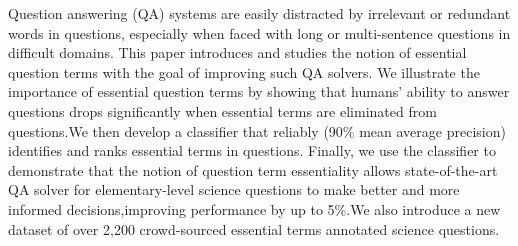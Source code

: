 Question answering (QA) systems are easily  distracted by  irrelevant or redundant words in questions, especially when faced with  long or multi-sentence                          questions  in difficult  domains. This paper introduces and studies  the  notion  of essential  question  terms with  the goal  of improving such QA  solvers. We                          illustrate the importance            of essential question  terms  by showing  that  humans'  ability  to  answer questions drops significantly when essential  terms  are eliminated  from  questions.We then develop a classifier that reliably (90\%  mean  average  precision) identifies and ranks essential terms in questions. Finally, we use the classifier to demonstrate that                          the  notion  of  question term essentiality allows state-of-the-art  QA  solver for  elementary-level  science  questions to make better and more informed decisions,improving performance by up to 5\%.We also  introduce  a  new  dataset  of  over 2,200 crowd-sourced essential terms annotated science questions.
